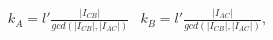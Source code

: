 \begin{equation}
\begin{array}{ll}
k_{A}=l' \frac{|I_{CB}|}{gcd(|I_{CB}|,|I_{AC}|)} & k_{B}=l'
\frac{|I_{AC}|}{gcd(|I_{CB}|,|I_{AC}|)},
\end{array}
\end{equation}

